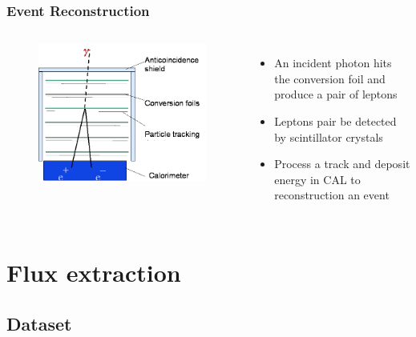 \documentclass{beamer}
\begin{document}
\begin{frame}
  \frametitle{Event Reconstruction}
  \begin{columns}
  
    \centering
    \begin{figure}[h!]
    \includegraphics[width = \textwidth]{img/LATMethodology}
    \end{figure}
  
    \begin{itemize}
    \item An incident photon hits the conversion foil and produce a pair of leptons
    \item Leptons pair be detected by scintillator crystals
    \item Process a track and deposit energy in CAL to reconstruction an event
    \end{itemize}
  \end{columns}
\end{frame}

\section{Flux extraction}
\subsection{Dataset}
\end{document}
